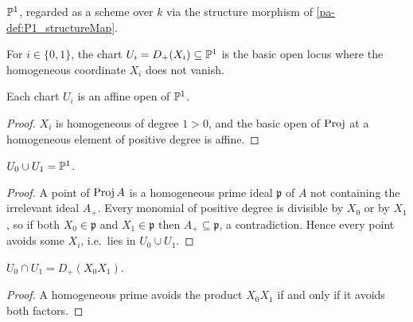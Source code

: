 \begin{definition}
  \label{pa-def:P1_asOver}
  \leanok

  \(\mathbb{P}^1\), regarded as a scheme over \(k\) via the structure morphism of
  \ref{pa-def:P1_structureMap}.
\end{definition}

\begin{definition}
  \label{pa-def:P1_chartOpen}
  \leanok

  For \(i \in \{0,1\}\), the chart \(U_i = D_+(X_i) \subseteq \mathbb{P}^1\) is the basic open locus
  where the homogeneous coordinate \(X_i\) does not vanish.
\end{definition}

\begin{lemma}
  \label{pa-lem:P1_chartOpen_affine}
  \leanok

  Each chart \(U_i\) is an affine open of \(\mathbb{P}^1\).
\end{lemma}
\begin{proof}
  \leanok
  \(X_i\) is homogeneous of degree \(1 > 0\), and the basic open of \(\operatorname{Proj}\) at a homogeneous
  element of positive degree is affine.
\end{proof}

\begin{lemma}
  \label{pa-lem:P1_chartOpen_sup}
  \leanok

  \(U_0 \cup U_1 = \mathbb{P}^1\).
\end{lemma}
\begin{proof}
  \leanok
  A point of \(\operatorname{Proj} A\) is a homogeneous prime ideal \(\mathfrak p\) of \(A\) not containing
  the irrelevant ideal \(A_+\). Every monomial of positive degree is divisible by \(X_0\) or
  by \(X_1\), so if both \(X_0 \in \mathfrak p\) and \(X_1 \in \mathfrak p\) then
  \(A_+ \subseteq \mathfrak p\), a contradiction. Hence every point avoids some \(X_i\), i.e.\
  lies in \(U_0 \cup U_1\).
\end{proof}

\begin{lemma}
  \label{pa-lem:P1_chartOpen_inf}
  \leanok

  \(U_0 \cap U_1 = D_+(X_0 X_1)\).
\end{lemma}
\begin{proof}
  \leanok
  A homogeneous prime avoids the product \(X_0 X_1\) if and only if it avoids both factors.
\end{proof}

